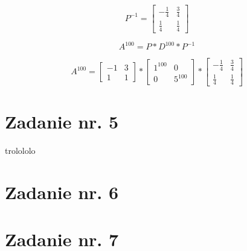\documentclass{article}
\begin{document}
\begin{equation} 
  P^{-1} = \begin{bmatrix} -\frac{1}{4} & \frac3{4}  \\[6pt]
    \frac{1}{4} & \frac{1}{4}  \end{bmatrix}
\end{equation}

\begin{equation} 
  A^{100} = P*D^{100}*P^{-1}
\end{equation}

\begin{equation} 
  A^{100} = \begin{bmatrix} -1 & 3  \\[6pt] 1 & 1  \end{bmatrix} * \begin{bmatrix} 1^{100} & 0  \\[6pt] 0 & 5^{100}  \end{bmatrix} * \begin{bmatrix} -\frac{1}{4} & \frac3{4}  \\[6pt]
    \frac{1}{4} & \frac{1}{4}  \end{bmatrix}
\end{equation}

\section{Zadanie nr. 5}
trolololo
\section{Zadanie nr. 6}

\section{Zadanie nr. 7}
\end{document}
